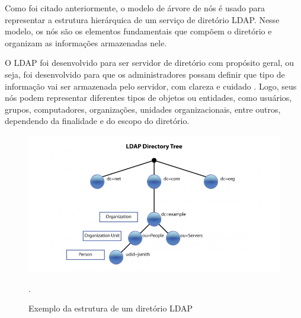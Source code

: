 Como foi citado anteriormente, o modelo de árvore de nós é usado para representar a estrutura hierárquica de um serviço de diretório LDAP. Nesse modelo, os nós são os elementos fundamentais que compõem o diretório e organizam as informações armazenadas nele.

O LDAP foi desenvolvido para ser servidor de diretório com propósito
geral, ou seja, foi desenvolvido para que os administradores possam
definir que tipo de informação vai ser armazenada pelo servidor, com clareza e
cuidado \cite{lima2021estudo}. Logo, seus nós podem representar diferentes tipos de objetos ou entidades, como usuários, grupos, computadores, organizações, unidades organizacionais, entre outros, dependendo da finalidade e do escopo do diretório.

\begin{figure}[h]
    \centering
	\includegraphics[scale=0.7]{projeto/textuais/LDAPTree.png}
	\caption[Exemplo da estrutura de um diretório LDAP]{Exemplo da estrutura de um diretório LDAP}.
	\label{fig:ldaptree}
\end{figure}

